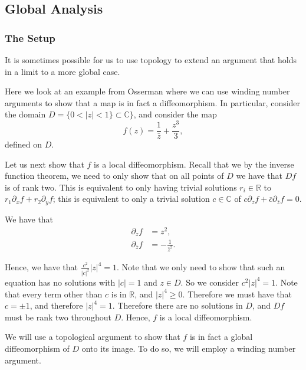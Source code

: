 \subsection{Global Analysis}
\subsubsection*{The Setup}

It is sometimes possible for us to use topology to extend an argument that holds in a limit to a more global case.

Here we look at an example from Osserman \cite{Osserman} where we can use winding number arguments to show that
a map is in fact a diffeomorphism. In particular, consider the domain \(D = \{0 < |z| < 1\} \subset \mathbb C\}\), 
and consider the map 
\begin{equation}
f(z) = \frac{1}{\bar z} + \frac{z^3}{3},
\end{equation} 
defined on \(D\). 

Let us next show that \(f\) is a local diffeomorphism. Recall that we by the inverse function theorem, we need to 
only show that on all points of \(D\) we have that \(Df\) is of rank two. This is equivalent to only having
trivial solutions \(r_i \in \mathbb R\) to \(r_1\partial_x f + r_2\partial_y f\); this is equivalent to only
a trivial solution \(c\in \mathbb C\) of \(c\partial_z f + \bar c \partial_{\bar z} f = 0\). 

We have that
\begin{align}
\partial_z f & = z^2, \\
\partial_{\bar z} f & = -\frac{1}{\bar z^2}.
\end{align}

Hence, we have that \(\frac{c^2}{|c|^2} |z|^4 = 1\). Note that we only need to show that such an equation has 
no solutions with \(|c| = 1\) and \(z \in D\). So we consider \(c^2 |z|^4 = 1\). Note that every term other than
\(c\) is in \(\mathbb R\), and \(|z|^4 \geq 0\). Therefore we must have that \(c = \pm 1\), 
and therefore \(|z|^4 = 1\). Therefore there are no solutions in \(D\), and \(Df\) must be rank two 
throughout \(D\). Hence, \(f\) is a local diffeomorphism.

We will use a topological argument to show that \(f\)
is in fact a global diffeomorphism of \(D\) onto its image. To do so, we will employ
a winding number argument.

